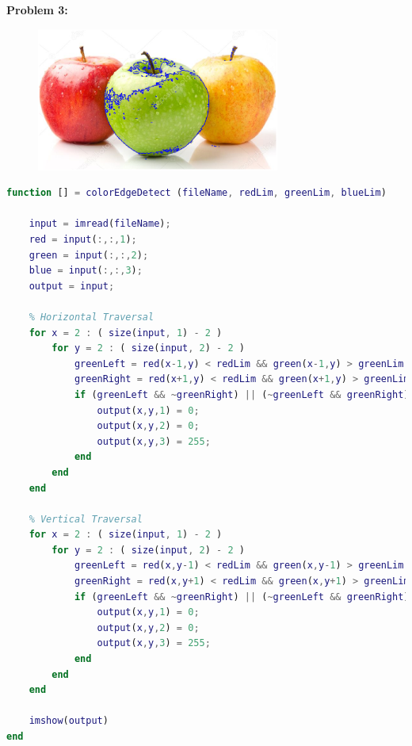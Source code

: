 \documentclass[11pt]{article}
\newenvironment{problem}[1]{\textbf{Problem #1: }}{\newpage}
\begin{document}
\begin{problem}{3}
\begin{figure}[h!]
			\includegraphics[width = 8cm]{Images/AppleBlue}
		\end{figure}
		\newpage
\begin{lstlisting}[language = Matlab]
function [] = colorEdgeDetect (fileName, redLim, greenLim, blueLim)

	input = imread(fileName);
	red = input(:,:,1);
	green = input(:,:,2);
	blue = input(:,:,3);
	output = input;
	
	% Horizontal Traversal
	for x = 2 : ( size(input, 1) - 2 )
		for y = 2 : ( size(input, 2) - 2 )
			greenLeft = red(x-1,y) < redLim && green(x-1,y) > greenLim && blue(x-1,y) < blueLim; 
			greenRight = red(x+1,y) < redLim && green(x+1,y) > greenLim && blue(x+1,y) < blueLim;
			if (greenLeft && ~greenRight) || (~greenLeft && greenRight)
				output(x,y,1) = 0;
				output(x,y,2) = 0;
				output(x,y,3) = 255;
			end      
		end
	end
	
	% Vertical Traversal
	for x = 2 : ( size(input, 1) - 2 )
		for y = 2 : ( size(input, 2) - 2 )
			greenLeft = red(x,y-1) < redLim && green(x,y-1) > greenLim && blue(x,y-1) < blueLim; 
			greenRight = red(x,y+1) < redLim && green(x,y+1) > greenLim && blue(x,y+1) < blueLim;
			if (greenLeft && ~greenRight) || (~greenLeft && greenRight)
				output(x,y,1) = 0;
				output(x,y,2) = 0;
				output(x,y,3) = 255;
			end      
		end
	end

	imshow(output)
end
\end{lstlisting}
		
	\end{problem}
\end{document}
